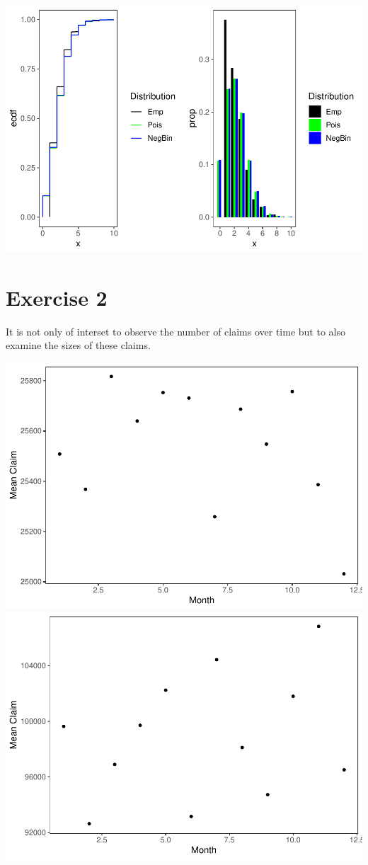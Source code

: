 \documentclass[]{article}
\begin{document}
\includegraphics{Projekt1_files/figure-latex/unnamed-chunk-5-4.pdf}

\section{Exercise 2}\label{exercise-2}

It is not only of interset to observe the number of claims over time but
to also examine the sizes of these claims.

\includegraphics{Projekt1_files/figure-latex/unnamed-chunk-6-1.pdf}
\includegraphics{Projekt1_files/figure-latex/unnamed-chunk-6-2.pdf}
\end{document}
